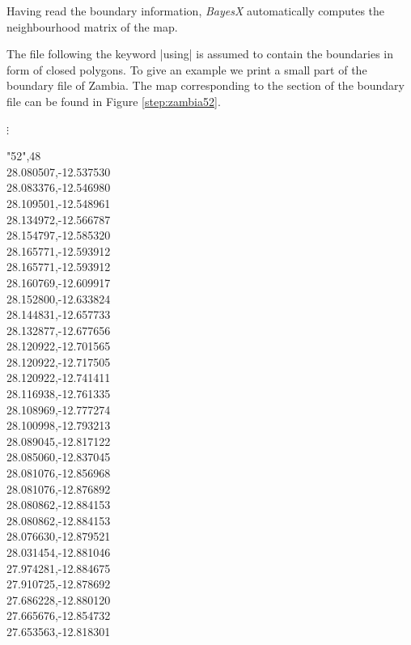 Having read the boundary information, {\it BayesX} automatically computes the neighbourhood matrix of the map.

The file following the keyword |using| is assumed to contain the boundaries in form of closed polygons. To give an example we
print a small part of the boundary file of Zambia. The map corresponding to the section of the boundary file can be found in
Figure \ref{step:zambia52}.

\footnotesize

\hspace{1cm}  $\vdots$

 "52",48\\
 28.080507,-12.537530\\
 28.083376,-12.546980\\
 28.109501,-12.548961\\
 28.134972,-12.566787\\
 28.154797,-12.585320\\
 28.165771,-12.593912\\
 28.165771,-12.593912\\
 28.160769,-12.609917\\
 28.152800,-12.633824\\
 28.144831,-12.657733\\
 28.132877,-12.677656\\
 28.120922,-12.701565\\
 28.120922,-12.717505\\
 28.120922,-12.741411\\
 28.116938,-12.761335\\
 28.108969,-12.777274\\
 28.100998,-12.793213\\
 28.089045,-12.817122\\
 28.085060,-12.837045\\
 28.081076,-12.856968\\
 28.081076,-12.876892\\
 28.080862,-12.884153\\
 28.080862,-12.884153\\
 28.076630,-12.879521\\
 28.031454,-12.881046\\
 27.974281,-12.884675\\
 27.910725,-12.878692\\
 27.686228,-12.880120\\
 27.665676,-12.854732\\
 27.653563,-12.818301\\

